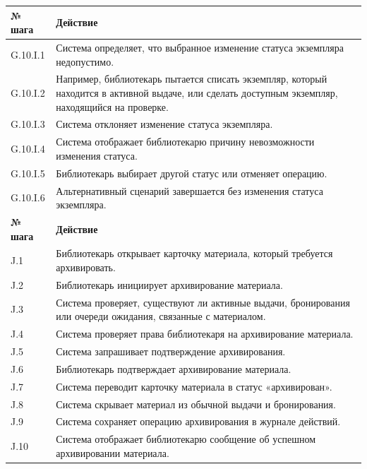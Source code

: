 \documentclass[12pt,a4paper]{article}
\begin{document}
\begin{xltabular}{\textwidth}{
				|>{\raggedright\arraybackslash}p{2.7cm}
				|>{\raggedright\arraybackslash}X|
			}
			
			\textbf{№ шага} & \textbf{Действие} \\
			\hline
			
			G.10.I.1 & Система определяет, что выбранное изменение статуса экземпляра
			недопустимо. \\
			\hline
			G.10.I.2 & Например, библиотекарь пытается списать экземпляр, который находится
			в активной выдаче, или сделать доступным экземпляр, находящийся на
			проверке. \\
			\hline
			G.10.I.3 & Система отклоняет изменение статуса экземпляра. \\
			\hline
			G.10.I.4 & Система отображает библиотекарю причину невозможности изменения
			статуса. \\
			\hline
			G.10.I.5 & Библиотекарь выбирает другой статус или отменяет операцию. \\
			\hline
			G.10.I.6 & Альтернативный сценарий завершается без изменения статуса экземпляра. \\
			\hline
			
			
			\textbf{№ шага} & \textbf{Действие} \\
			\hline
			
			J.1 & Библиотекарь открывает карточку материала, который требуется
			архивировать. \\
			\hline
			J.2 & Библиотекарь инициирует архивирование материала. \\
			\hline
			J.3 & Система проверяет, существуют ли активные выдачи, бронирования или
			очереди ожидания, связанные с материалом. \\
			\hline
			J.4 & Система проверяет права библиотекаря на архивирование материала. \\
			\hline
			J.5 & Система запрашивает подтверждение архивирования. \\
			\hline
			J.6 & Библиотекарь подтверждает архивирование материала. \\
			\hline
			J.7 & Система переводит карточку материала в статус «архивирован». \\
			\hline
			J.8 & Система скрывает материал из обычной выдачи и бронирования. \\
			\hline
			J.9 & Система сохраняет операцию архивирования в журнале действий. \\
			\hline
			J.10 & Система отображает библиотекарю сообщение об успешном архивировании
			материала. \\
			\hline
			

\end{xltabular}
\end{document}
